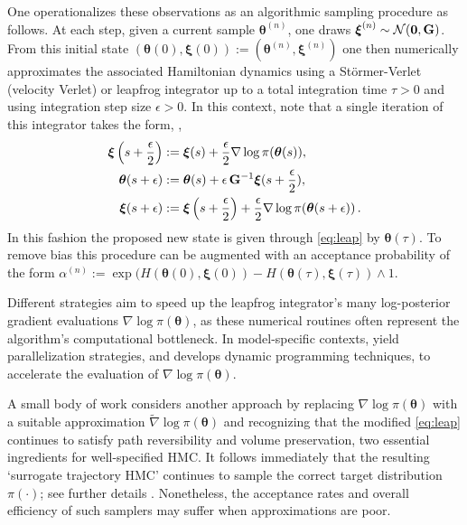 \documentclass[9pt,twocolumn,twoside]{pnas-new}
\newcommand{\?}{\textbf{?}}
\newcommand{\Zero}{\boldsymbol{0}}
\newcommand{\ttheta}{\boldsymbol{\theta}}
\newcommand{\mom}{\boldsymbol{\xi}}
\begin{document}
One operationalizes these observations as an algorithmic sampling
procedure as follows. At each step, given a current sample
$\ttheta^{(n)}$, one draws $\mom^{(n)} \sim \mathcal{N}(\Zero,\G)$.
From this initial state
$(\ttheta(0), \mom(0)) := (\ttheta^{(n)},\mom^{(n)})$ one then
numerically approximates the associated Hamiltonian dynamics using a
St\"{o}rmer-Verlet (velocity Verlet) or leapfrog integrator up to a
total integration time $\tau >0$ and using integration step size
$\epsilon > 0$.  In this context, note that a single iteration of this
integrator takes the form, \cite{leimkuhler2004simulating},
\begin{align}
  \mom\left(s + \frac{\epsilon}{2}\right)
  &:= \mom(s) + \frac{\epsilon}{2} \nabla \log \pi(\ttheta(s)),  
	 \nonumber \\
  \ttheta(s+\epsilon) &:= \ttheta(s) + \epsilon \, \G^{-1}\mom(s+\frac{\epsilon}{2}), 
		 \label{eq:leap}\\ 
  \mom(s + \epsilon)
  &:= \mom\left(s+\frac{\epsilon}{2}\right)
    + \frac{\epsilon}{2} \nabla \log \pi(\ttheta(s+\epsilon))  \, .
	\nonumber
\end{align}
In this fashion the proposed new state is given through
\eqref{eq:leap} by $\ttheta(\tau)$.  To remove bias this procedure can
be augmented with an acceptance probability of the form
$\alpha^{(n)} := \exp( H( \ttheta(0), \mom(0)) - H(\ttheta(\tau),
\mom(\tau)) \wedge 1$.



Different strategies aim to speed up the leapfrog integrator's many
log-posterior gradient evaluations $\nabla \log \pi (\ttheta)$, as
these numerical routines often represent the algorithm's computational
bottleneck.  In model-specific contexts,
\cite{holbrook2021massive,holbrook2022bayesian,holbrook2022viral}
yield parallelization strategies, and \cite{ji2020gradients} develops
dynamic programming techniques, to accelerate the evaluation of
$\nabla \log \pi (\ttheta)$.

A small body of work considers another approach by replacing
$\nabla \log \pi (\ttheta)$ with a suitable approximation
$\widetilde{\nabla} \log \pi (\ttheta)$ and recognizing that the
modified \eqref{eq:leap} continues to satisfy path reversibility and
volume preservation, two essential ingredients for well-specified
HMC. It follows immediately that the resulting `surrogate trajectory
HMC' continues to sample the correct target distribution $\pi(\cdot)$;
see further details \cite{neal2011mcmc, glatt2020accept}.
Nonetheless, the acceptance rates and overall efficiency of such
samplers may suffer when approximations are poor.
\end{document}
